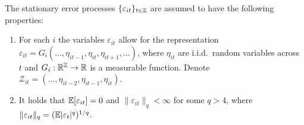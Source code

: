 \documentclass[a4paper,12pt]{article}
\begin{document}
The stationary error processes $\{\varepsilon_{it}\}_{t\in\mathbb{Z}}$ are assumed to have the following properties: 
\begin{enumerate}[label=(C\arabic*),leftmargin=1.05cm]

\item \label{C-err1} For each $i$ the variables $\varepsilon_{it}$ allow for the representation $\varepsilon_{it} = G_i(\ldots,\eta_{it-1},\eta_{it},\eta_{it+1},\ldots)$, where $\eta_{it}$ are i.i.d.\ random variables across $t$ and $G_i: \mathbb{R}^{\mathbb{Z}} \rightarrow \mathbb{R}$ is a measurable function. Denote $\mathcal{Z}_{it} = (\ldots,\eta_{it-2},\eta_{it-1},\eta_{it})$.

\item \label{C-err2} It holds that $\mathbb{E}[\varepsilon_{it}] =0$ and $\| \varepsilon_{it} \|_q < \infty$ for some $q > 4$, where $\| \varepsilon_{it} \|_q = (\mathbb{E}|\varepsilon_t|^q)^{1/q}$. 

\end{enumerate}
\end{document}
